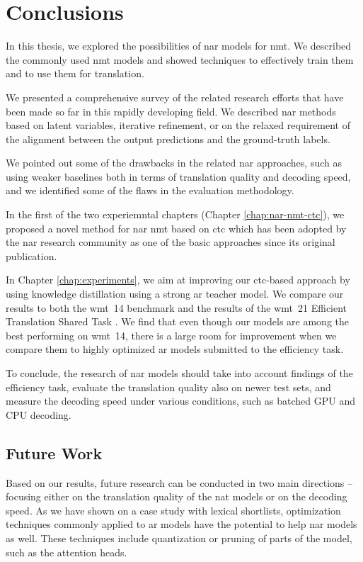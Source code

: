 \chapter{Conclusions}
\label{chap:conclusions}

In this thesis, we explored the possibilities of \ac{nar} models for
\ac{nmt}. We described the commonly used \ac{nmt} models and showed techniques
to effectively train them and to use them for translation.

We presented a comprehensive survey of the related research efforts that have
been made so far in this rapidly developing field. We described \ac{nar}
methods based on latent variables, iterative refinement, or on the relaxed
requirement of the alignment between the output predictions and the
ground-truth labels.

We pointed out some of the drawbacks in the related \ac{nar} approaches, such
as using weaker baselines both in terms of translation quality and decoding
speed, and we identified some of the flaws in the evaluation methodology.

In the first of the two experiemntal chapters (Chapter \ref{chap:nar-nmt-ctc}),
we proposed a novel method for \ac{nar} \ac{nmt} based on \ac{ctc} which has
been adopted by the \ac{nar} research community as one of the basic approaches
since its original publication.

In Chapter \ref{chap:experiments}, we aim at improving our \acs{ctc}-based
approach by using knowledge distillation using a strong \ac{ar} teacher model.
We compare our results to both the \acs{wmt}~14 benchmark and the results of
the \acs{wmt}~21 Efficient Translation Shared Task
\citep{heafield-etal-2021-findings}. We find that even though our models are
among the best performing on \acs{wmt}~14, there is a large room for
improvement when we compare them to highly optimized \acl{ar} models submitted
to the efficiency task.

To conclude, the research of \acs{nar} models should take into account findings
of the efficiency task, evaluate the translation quality also on newer test
sets, and measure the decoding speed under various conditions, such as batched
GPU and CPU decoding.

\section*{Future Work}
Based on our results, future research can be conducted in two main directions
-- focusing either on the translation quality of the \ac{nat} models or on the
decoding speed. As we have shown on a case study with lexical shortlists,
optimization techniques commonly applied to \ac{ar} models have the potential
to help \ac{nar} models as well. These techniques include quantization or
pruning of parts of the model, such as the attention heads.

